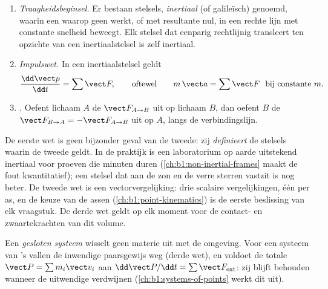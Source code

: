 \begin{theorem}\label{thm:b1:newton-dynamics:laws}
\begin{enumerate}
  \item \emph{Traagheidsbeginsel.} Er bestaan stelsels, \emph{inertiaal}
        (of galileïsch) genoemd, waarin een  waarop geen 
        werkt, of  met resultante nul, in een rechte
        lijn met constante snelheid beweegt. Elk stelsel dat eenparig rechtlijnig
        transleert ten opzichte van een inertiaalstelsel is zelf inertiaal.
  \item \emph{Impulswet.} In een inertiaalstelsel geldt
        \[
        \frac{\dd\vect p}{\dd t} = \sum\vect F, \qquad \text{oftewel}\qquad
        m\,\vect a = \sum\vect F \ \text{ bij constante } m .
        \]
  \item \emph{.} Oefent lichaam $A$ de  $\vect F_{A\to B}$
        uit op lichaam $B$, dan oefent $B$ de  $\vect F_{B\to A} = -\vect F_{A\to B}$
        uit op $A$, langs de verbindingslijn.
\end{enumerate}
\end{theorem}
\admitted

\begin{remark}\label{rem:b1:newton-dynamics:meaning}
De eerste wet is geen bijzonder geval van de tweede: zij \emph{definieert}
de stelsels waarin de tweede geldt. In de praktijk is een laboratorium op
aarde uitstekend inertiaal voor proeven die minuten duren
(\cref{ch:b1:non-inertial-frames} maakt de fout kwantitatief); een stelsel
dat aan de zon en de verre sterren vastzit is nog beter. De tweede
wet is een vectorvergelijking: drie scalaire vergelijkingen, één per as, en
de keuze van de assen (\cref{ch:b1:point-kinematics}) is de eerste
beslissing van elk vraagstuk. De derde wet geldt op elk moment voor
de contact- en zwaartekrachten van dit volume.
\end{remark}

\begin{definition}\label{def:b1:newton-dynamics:conservation}
Een \emph{gesloten systeem} wisselt geen materie uit met de omgeving. Voor een
systeem van 's vallen de inwendige  paarsgewijs weg (derde wet),
en voldoet de totale  $\vect P = \sum m_i\vect v_i$ aan
$\dd\vect P/\dd t = \sum\vect F_{\mathrm{ext}}$: zij blijft behouden wanneer
de uitwendige  verdwijnen (\cref{ch:b1:systems-of-points} werkt dit
uit).
\end{definition}

